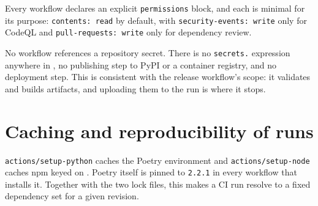 Every workflow declares an explicit \texttt{permissions} block, and each is
minimal for its purpose: \texttt{contents: read} by default, with
\texttt{security-events: write} only for CodeQL and
\texttt{pull-requests: write} only for dependency review.

No workflow references a repository secret. There is no
\texttt{secrets.} expression anywhere in , no
publishing step to PyPI or a container registry, and no deployment step. This
is consistent with the release workflow's scope: it validates and builds
artifacts, and uploading them to the run is where it stops.

\section{Caching and reproducibility of runs}

\texttt{actions/setup-python} caches the Poetry environment and
\texttt{actions/setup-node} caches npm keyed on
. Poetry itself is pinned to
\texttt{2.2.1} in every workflow that installs it. Together with the two lock
files, this makes a CI run resolve to a fixed dependency set for a given
revision.


